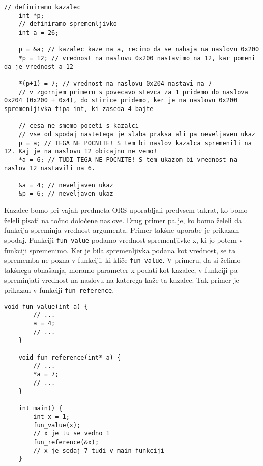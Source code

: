 \documentclass[12pt,letterpaper]{article}
\begin{document}
\begin{center}
\begin{lstlisting}[style=CStyle]
    // definiramo kazalec
    int *p;
    // definiramo spremenljivko 
    int a = 26;
    
    p = &a; // kazalec kaze na a, recimo da se nahaja na naslovu 0x200
    *p = 12; // vrednost na naslovu 0x200 nastavimo na 12, kar pomeni da je vrednost a 12
    
    *(p+1) = 7; // vrednost na naslovu 0x204 nastavi na 7   
    // v zgornjem primeru s povecavo stevca za 1 pridemo do naslova 0x204 (0x200 + 0x4), do stirice pridemo, ker je na naslovu 0x200 spremenljivka tipa int, ki zaseda 4 bajte
    
    // cesa ne smemo poceti s kazalci
    // vse od spodaj nastetega je slaba praksa ali pa neveljaven ukaz
    p = a; // TEGA NE POCNITE! S tem bi naslov kazalca spremenili na 12. Kaj je na naslovu 12 obicajno ne vemo!
    *a = 6; // TUDI TEGA NE POCNITE! S tem ukazom bi vrednost na naslov 12 nastavili na 6.
    
    &a = 4; // neveljaven ukaz
    &p = 6; // neveljaven ukaz
\end{lstlisting}
\end{center}

Kazalce bomo pri vajah predmeta ORS uporabljali predvsem takrat, ko bomo želeli pisati na točno določene naslove. Drug primer pa je, ko bomo želeli da funkcija spreminja vrednost argumenta. Primer takšne uporabe je prikazan spodaj. Funkciji \texttt{fun\_value} podamo vrednost spremenljivke x, ki jo potem v funkciji spremenimo. Ker je bila spremenljivka podana kot vrednost, se ta sprememba ne pozna v funkciji, ki kliče \texttt{fun\_value}. V primeru, da si želimo takšnega obnašanja, moramo parameter x podati kot kazalec, v funkciji pa spreminjati vrednost na naslovu na katerega kaže ta kazalec. Tak primer je prikazan v funkciji \texttt{fun\_reference}.

\begin{center}
\begin{lstlisting}[style=CStyle]
    void fun_value(int a) {
        // ...
        a = 4;
        // ...
    }
    
    void fun_reference(int* a) {
        // ...
        *a = 7;
        // ...
    }
    
    int main() {
        int x = 1;
        fun_value(x);
        // x je tu se vedno 1
        fun_reference(&x);
        // x je sedaj 7 tudi v main funkciji
    }
\end{lstlisting}
\end{center}
\end{document}
